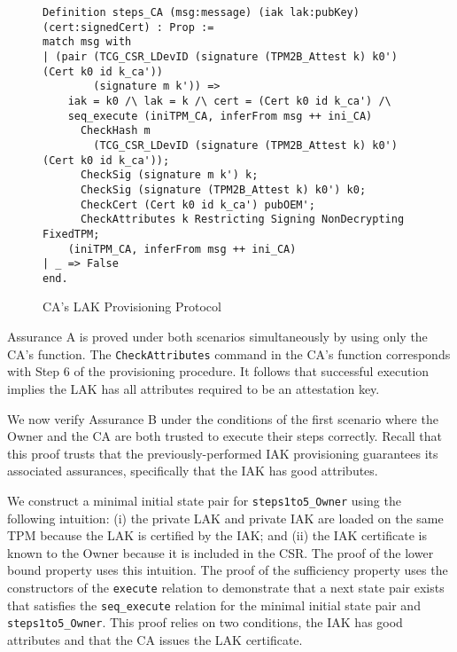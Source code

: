 \documentclass[runningheads]{llncs}
\begin{document}
\begin{figure}[hpbt]
\vspace{-\medskipamount}
\vspace{-\medskipamount}
\begin{lstlisting}[language=Coq]
Definition steps_CA (msg:message) (iak lak:pubKey) (cert:signedCert) : Prop :=
match msg with
| (pair (TCG_CSR_LDevID (signature (TPM2B_Attest k) k0') (Cert k0 id k_ca'))
        (signature m k')) =>
    iak = k0 /\ lak = k /\ cert = (Cert k0 id k_ca') /\
    seq_execute (iniTPM_CA, inferFrom msg ++ ini_CA)
      CheckHash m 
        (TCG_CSR_LDevID (signature (TPM2B_Attest k) k0') (Cert k0 id k_ca'));
      CheckSig (signature m k') k;
      CheckSig (signature (TPM2B_Attest k) k0') k0;
      CheckCert (Cert k0 id k_ca') pubOEM';
      CheckAttributes k Restricting Signing NonDecrypting FixedTPM;
    (iniTPM_CA, inferFrom msg ++ ini_CA)
| _ => False
end.
\end{lstlisting}
\caption{CA's LAK Provisioning Protocol}
\label{fig:lak_model_CA}
\end{figure}

Assurance A is proved under both scenarios simultaneously 
by using only the CA's function. 
The \verb|CheckAttributes| command in the CA's function corresponds with
Step 6 of the provisioning procedure.  It follows that successful
execution implies the LAK has all attributes required to be an
attestation key.

We now verify Assurance B under the conditions of the first scenario
where the Owner and the CA are both trusted to execute their steps
correctly. Recall that this proof trusts that the
previously-performed IAK provisioning guarantees its associated
assurances, specifically that the IAK has good attributes.

We construct a minimal initial state pair for \verb|steps1to5_Owner|
using the following intuition: (i) the private LAK and private IAK are
loaded on the same TPM because the LAK is certified by the IAK; and
(ii) the IAK certificate is known to the Owner because it is included
in the CSR.  The proof of the lower bound property uses this
intuition.  The proof of the sufficiency property uses the
constructors of the \verb|execute| relation to demonstrate that a next
state pair exists that satisfies the \verb|seq_execute| relation for
the minimal initial state pair and \verb|steps1to5_Owner|. This proof
relies on two conditions, the IAK has good attributes and that the CA
issues the LAK certificate.

\end{document}
